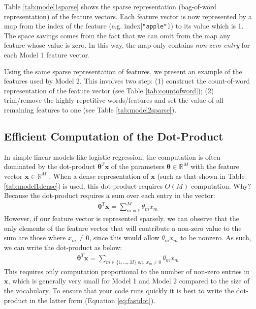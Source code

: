 \documentclass[11pt]{article}
\numberwithin{equation}{section} %
\numberwithin{figure}{section} %
\numberwithin{table}{section} %
\newcommand{\Rb}{\mathbb{R}}
\newcommand{\xv}{\mathbf{x}}
\newcommand{\thetav     }{\boldsymbol \theta     }
\begin{document}
Table \ref{tab:model1sparse} shows the sparse representation (bag-of-word representation) of the feature vectors. Each feature vector is now represented by a map from the index of the feature (e.g. {index[\tt "apple"]}) to its value which is 1. The space savings comes from the fact that we can omit from the map any feature whose value is zero. In this way, the map only contains \emph{non-zero entry} for each Model 1 feature vector.

Using the same sparse representation of features, we present an example of the features used by Model 2. This involves two step: (1) construct the count-of-word representation of the feature vector (see Table \ref{tab:countofword}); (2) trim/remove the highly repetitive words/features  and set the value of all remaining features to one (see Table \ref{tab:model2sparse}).




\subsection{Efficient Computation of the Dot-Product} \label{efficientdp}

In simple linear models like logistic regression, the computation is often dominated by the dot-product $\thetav^T \xv$ of the parameters $\thetav \in \Rb^M$ with the feature vector $\xv \in \Rb^M$ . When a dense representation of $\xv$ (such as that shown in Table \ref{tab:model1dense}) is used, this dot-product requires $O(M)$ computation. Why? Because the dot-product requires a sum over each entry in the vector:
\begin{align}
\thetav^T \xv = \sum_{m=1}^M \theta_m x_m
\end{align}
%
However, if our feature vector is represented sparsely, we can observe that the only elements of the feature vector that will contribute a non-zero value to the sum are those where $x_m \neq 0$, since this would allow $\theta_m x_m$ to be nonzero. As such, we can write the dot-product as below:
\begin{align}
\thetav^T \xv = \sum_{m \in \{1,\ldots,M\} \text{ s.t. } x_m \neq 0} \theta_m x_m
\label{eq:fastdot}
\end{align}
This requires only computation proportional to the number of non-zero entries in $\xv$, which is generally very small for Model 1 and Model 2 compared to the size of the vocabulary. To ensure that your code runs quickly it is best to write the dot-product in the latter form (Equation \eqref{eq:fastdot}).
\end{document}
